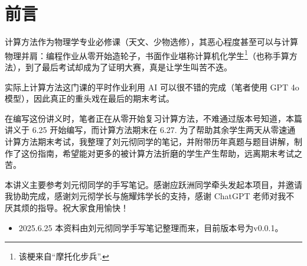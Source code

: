 \chapter*{前言}
计算方法作为物理学专业必修课（天文、少物选修），其恶心程度甚至可以与计算物理并肩：编程作业从零开始造轮子，书面作业堪称计算机化学生\footnote{该梗来自“摩托化步兵”.}（也称手算方法），到了最后考试却成为了证明大赛，真是让学生叫苦不迭。

实际上计算方法这门课的平时作业利用 AI 可以很不错的完成（笔者使用 GPT 4o 模型），因此真正的重头戏在最后的期末考试。

在编写这份讲义时，笔者正在从零开始复习计算方法，不难通过版本号知道，本篇讲义于 6.25 开始编写，而计算方法期末在 6.27. 为了帮助其余学生两天从零速通计算方法期末考试，我整理了刘元彻同学的笔记，并附带历年真题与题目讲解，制作了这份指南，希望能对更多的被计算方法折磨的学生产生帮助，远离期末考试之苦。

本讲义主要参考刘元彻同学的手写笔记。感谢应跃洲同学牵头发起本项目，并邀请我协助完成，感谢刘元彻学长与施耀炜学长的支持，感谢 ChatGPT 老师对我不厌其烦的指导。祝大家食用愉快！


\begin{itemize}
    \item 2025.6.25 本资料由刘元彻同学手写笔记整理而来，目前版本号为v0.0.1。
\end{itemize}